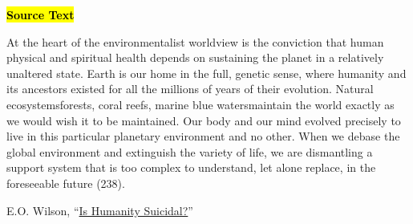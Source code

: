 \begin{tcolorbox}[enhanced,width=4.2in,left=.3in, right=.3in,
   drop fuzzy shadow southeast,
    boxrule=0.4pt,sharp corners,colframe=black!80!black,colback=white!10]

\medskip

{\small
\begin{doublespacing}
\textbf{\hl{Source Text}}
\smallskip

\hspace{.5cm}At the heart of the environmentalist worldview is the conviction that human physical and spiritual health depends on sustaining the planet in a relatively unaltered state. Earth is our home in the full, genetic sense, where humanity and its ancestors existed for all the millions of years of their evolution. Natural ecosystems\textemdash forests, coral reefs, marine blue waters\textemdash maintain the world exactly as we would wish it to be maintained. Our body and our mind evolved precisely to live in this particular planetary environment and no other. When we debase the global environment and extinguish the variety of life, we are dismantling a support system that is too complex to understand, let alone replace, in the foreseeable future (238).

\bigskip

\noindent\textemdash E.O. Wilson, “\href{https://doi-org.dartmouth.idm.oclc.org/10.1016/0303-2647(93)90052-E}{Is Humanity Suicidal?}”

\bigskip

\end{doublespacing}}

\end{tcolorbox}

